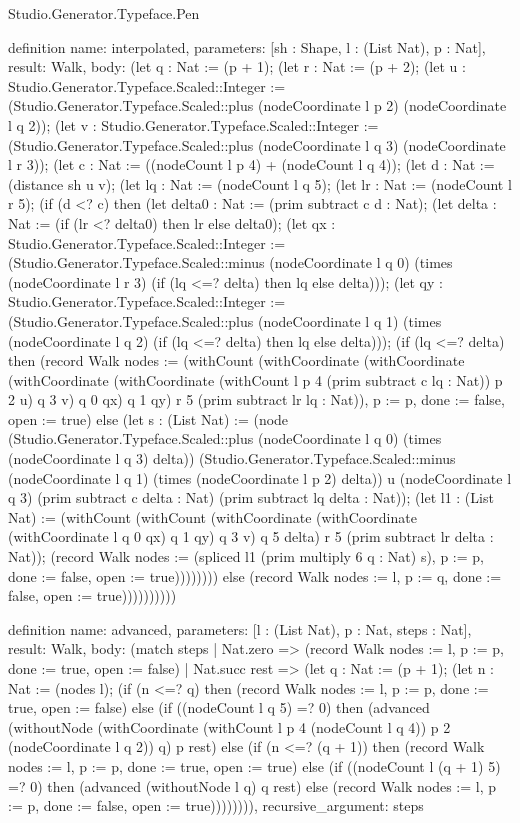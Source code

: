 \begin{lexlean}{Studio.Generator.Typeface.Pen}
\begin{semanticmodule}
definition{
  name: interpolated,
  parameters: [sh : Shape, l : (List Nat), p : Nat],
  result: Walk,
  body: (let q : Nat := (p + 1); (let r : Nat := (p + 2); (let u : Studio.Generator.Typeface.Scaled::Integer := (Studio.Generator.Typeface.Scaled::plus (nodeCoordinate l p 2) (nodeCoordinate l q 2)); (let v : Studio.Generator.Typeface.Scaled::Integer := (Studio.Generator.Typeface.Scaled::plus (nodeCoordinate l q 3) (nodeCoordinate l r 3)); (let c : Nat := ((nodeCount l p 4) + (nodeCount l q 4)); (let d : Nat := (distance sh u v); (let lq : Nat := (nodeCount l q 5); (let lr : Nat := (nodeCount l r 5); (if (d <? c) then (let delta0 : Nat := (prim subtract c d : Nat); (let delta : Nat := (if (lr <? delta0) then lr else delta0); (let qx : Studio.Generator.Typeface.Scaled::Integer := (Studio.Generator.Typeface.Scaled::minus (nodeCoordinate l q 0) (times (nodeCoordinate l r 3) (if (lq <=? delta) then lq else delta))); (let qy : Studio.Generator.Typeface.Scaled::Integer := (Studio.Generator.Typeface.Scaled::plus (nodeCoordinate l q 1) (times (nodeCoordinate l q 2) (if (lq <=? delta) then lq else delta))); (if (lq <=? delta) then (record Walk {nodes := (withCount (withCoordinate (withCoordinate (withCoordinate (withCoordinate (withCount l p 4 (prim subtract c lq : Nat)) p 2 u) q 3 v) q 0 qx) q 1 qy) r 5 (prim subtract lr lq : Nat)), p := p, done := false, open := true}) else (let s : (List Nat) := (node (Studio.Generator.Typeface.Scaled::plus (nodeCoordinate l q 0) (times (nodeCoordinate l q 3) delta)) (Studio.Generator.Typeface.Scaled::minus (nodeCoordinate l q 1) (times (nodeCoordinate l p 2) delta)) u (nodeCoordinate l q 3) (prim subtract c delta : Nat) (prim subtract lq delta : Nat)); (let l1 : (List Nat) := (withCount (withCount (withCoordinate (withCoordinate (withCoordinate l q 0 qx) q 1 qy) q 3 v) q 5 delta) r 5 (prim subtract lr delta : Nat)); (record Walk {nodes := (spliced l1 (prim multiply 6 q : Nat) s), p := p, done := false, open := true})))))))) else (record Walk {nodes := l, p := q, done := false, open := true}))))))))))
}

definition{
  name: advanced,
  parameters: [l : (List Nat), p : Nat, steps : Nat],
  result: Walk,
  body: (match steps
    | Nat.zero => (record Walk {nodes := l, p := p, done := true, open := false})
    | Nat.succ rest => (let q : Nat := (p + 1); (let n : Nat := (nodes l); (if (n <=? q) then (record Walk {nodes := l, p := p, done := true, open := false}) else (if ((nodeCount l q 5) =? 0) then (advanced (withoutNode (withCoordinate (withCount l p 4 (nodeCount l q 4)) p 2 (nodeCoordinate l q 2)) q) p rest) else (if (n <=? (q + 1)) then (record Walk {nodes := l, p := p, done := true, open := true}) else (if ((nodeCount l (q + 1) 5) =? 0) then (advanced (withoutNode l q) q rest) else (record Walk {nodes := l, p := p, done := false, open := true})))))))),
  recursive_argument: steps
}


\end{semanticmodule}
\end{lexlean}
